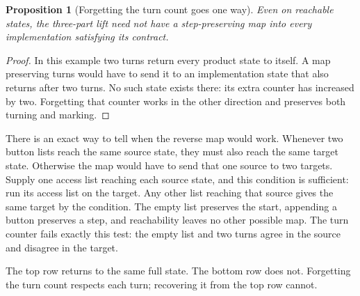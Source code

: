 \documentclass[11pt,twoside]{article}
\theoremstyle{thielethm}
\newtheorem{proposition}[theorem]{Proposition}
\theoremstyle{thieledef}
\theoremstyle{thieledef}
\theoremstyle{thieledef}
\theoremstyle{thielethm}
\theoremstyle{thieleobs}
\theoremstyle{thielethm}
\begin{document}
\begin{proposition}[Forgetting the turn count goes one way]\label{prop:lift-history-direction}
Even on reachable states, the three-part lift need not have a
step-preserving map into every implementation satisfying its contract.
\end{proposition}
\begin{proof}
In this example two turns return every product state to itself. A map
preserving turns would have to send it to an implementation state that
also returns after two turns. No such state exists there: its extra
counter has increased by two. Forgetting that counter works in the other
direction and preserves both turning and marking.
\end{proof}

There is an exact way to tell when the reverse map would work. Whenever
two button lists reach the same source state, they must also reach the
same target state. Otherwise the map would have to send that one source
to two targets. Supply one access list reaching each source state, and
this condition is sufficient: run its access list on the target. Any other
list reaching that source gives the same target by the condition. The
empty list preserves the start, appending a button preserves a step, and
reachability leaves no other possible map. The turn counter fails exactly
this test: the empty list and two turns agree in the source and disagree
in the target.

\begin{center}

\small The top row returns to the same full state. The bottom row does not.
Forgetting the turn count respects each turn; recovering it from the top row cannot.
\end{center}
\end{document}
